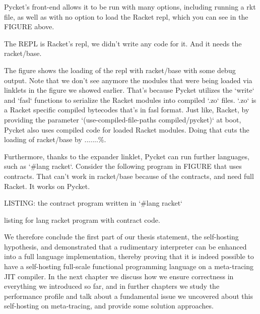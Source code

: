 		\begin{paragraph-here}%
			Pycket's front-end allows it to be run with many options, including running a rkt file, as well as with no option to load the Racket repl, which you can see in the FIGURE above.
		\end{paragraph-here}

		\begin{paragraph-here}%
			The REPL is Racket's repl, we didn't write any code for it. And it needs the racket/base.
		\end{paragraph-here}


		\begin{paragraph-here}%
			The figure shows the loading of the repl with racket/base with some debug output. Note that we don't see anymore the modules that were being loaded via linklets in the figure we showed earlier. That's because Pycket utilizes the `write` and `fasl` functions to serialize the Racket modules into compiled `.zo` files. `.zo` is a Racket specific compiled bytecodes that's in fasl format. Just like, Racket, by providing the parameter `(use-compiled-file-paths compiled/pycket)` at boot, Pycket also uses compiled code for loaded Racket modules. Doing that cuts the loading of racket/base by .......\%.
		\end{paragraph-here}

		\begin{paragraph-here}%
			Furthermore, thanks to the expander linklet, Pycket can run further languages, such as `\#lang racket`. Consider the following program in FIGURE that uses contracts. That can't work in racket/base because of the contracts, and need full Racket. It works on Pycket.
		\end{paragraph-here}

		\begin{figure-here}
			LISTING: the contract program written in `\#lang racket`

			\begin{todo}
				listing for lang racket program with contract code.
			\end{todo}
		\end{figure-here}

		\begin{paragraph-here}%
			We therefore conclude the first part of our thesis statement, the self-hosting hypothesis, and demonstrated that a rudimentary interpreter can be enhanced into a full language implementation, thereby proving that it is indeed possible to have a self-hosting full-scale functional programming language on a meta-tracing JIT compiler.
			In the next chapter we discuss how we ensure correctness in everything we introduced so far, and in further chapters we study the performance profile and talk about a fundamental issue we uncovered about this self-hosting on meta-tracing, and provide some solution approaches.
		\end{paragraph-here}


